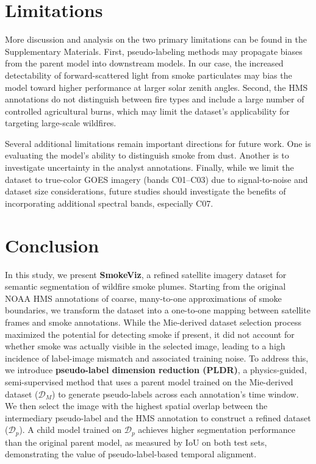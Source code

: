 \documentclass{article}
\begin{document}
\section{Limitations}

More discussion and analysis on the two primary limitations can be found in the Supplementary Materials. First, pseudo-labeling methods may propagate biases from the parent model into downstream models. In our case, the increased detectability of forward-scattered light from smoke particulates may bias the model toward higher performance at larger solar zenith angles. Second, the HMS annotations do not distinguish between fire types and include a large number of controlled agricultural burns, which may limit the dataset’s applicability for targeting large-scale wildfires.

Several additional limitations remain important directions for future work. One is evaluating the model’s ability to distinguish smoke from dust. Another is to investigate uncertainty in the analyst annotations. Finally, while we limit the dataset to true-color GOES imagery (bands C01–C03) due to signal-to-noise and dataset size considerations, future studies should investigate the benefits of incorporating additional spectral bands, especially C07. 

\section{Conclusion}

In this study, we present \textbf{SmokeViz}, a refined satellite imagery dataset for semantic segmentation of wildfire smoke plumes. Starting from the original NOAA HMS annotations of coarse, many-to-one approximations of smoke boundaries, we transform the dataset into a one-to-one mapping between satellite frames and smoke annotations. While the Mie-derived dataset selection process maximized the potential for detecting smoke if present, it did not account for whether smoke was actually visible in the selected image, leading to a high incidence of label-image mismatch and associated training noise. To address this, we introduce \textbf{pseudo-label dimension reduction (PLDR)}, a physics-guided, semi-supervised method that uses a parent model trained on the Mie-derived dataset (\(\mathcal{D}_M\)) to generate pseudo-labels across each annotation’s time window. We then select the image with the highest spatial overlap between the intermediary pseudo-label and the HMS annotation to construct a refined dataset (\(\mathcal{D}_p\)). A child model trained on \(\mathcal{D}_p\) achieves higher segmentation performance than the original parent model, as measured by IoU on both test sets, demonstrating the value of pseudo-label-based temporal alignment.
\end{document}

